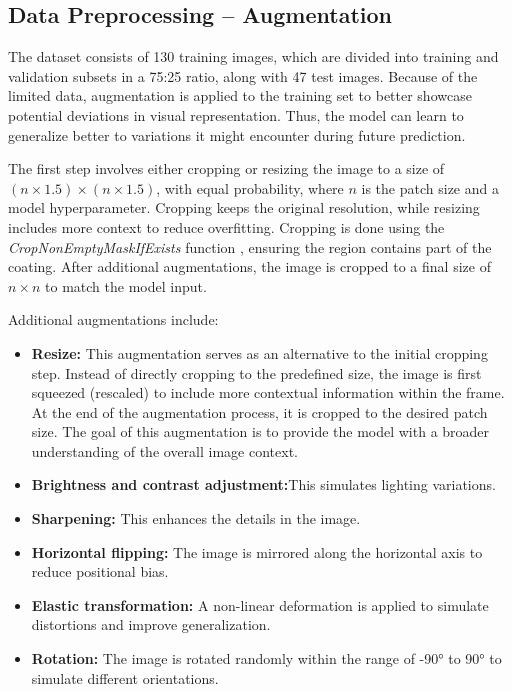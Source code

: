 \subsection{Data Preprocessing – Augmentation} \label{sec:aug}
The dataset consists of 130 training images, which are divided into training and validation subsets in a 75:25 ratio, along with 47 test images. Because of the limited data, augmentation is applied to the training set to better showcase potential deviations in visual representation. Thus, the model can learn to generalize better to variations it might encounter during future prediction. 

The first step involves either cropping or resizing the image to a size of $(n \times 1.5) \times (n \times 1.5)$, with equal probability, where $n$ is the patch size and a model hyperparameter. Cropping keeps the original resolution, while resizing includes more context to reduce overfitting. Cropping is done using the \textit{CropNonEmptyMaskIfExists} function \cite{info11020125}, ensuring the region contains part of the coating. After additional augmentations, the image is cropped to a final size of $n \times n$ to match the model input.

Additional augmentations include:

\begin{itemize}
    \item \textbf{Resize:} This augmentation serves as an alternative to the initial cropping step. Instead of directly cropping to the predefined size, the image is first squeezed (rescaled) to include more contextual information within the frame. At the end of the augmentation process, it is cropped to the desired patch size. The goal of this augmentation is to provide the model with a broader understanding of the overall image context.
    \item \textbf{Brightness and contrast adjustment:}This simulates lighting variations.
    \item \textbf{Sharpening:} This enhances the details in the image.
    \item \textbf{Horizontal flipping:} The image is mirrored along the horizontal axis to reduce positional bias.
    \item \textbf{Elastic transformation:} A non-linear deformation is applied to simulate distortions and improve generalization.
    \item \textbf{Rotation:} The image is rotated randomly within the range of -90° to 90° to simulate different orientations.
\end{itemize}

